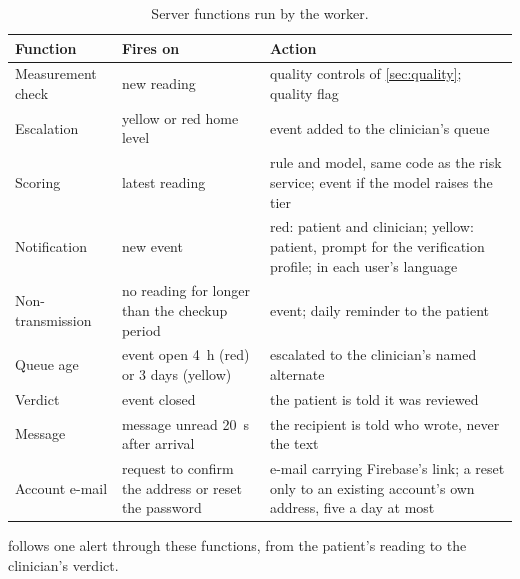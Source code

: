 \begin{table}[htbp]
\centering\footnotesize
\caption{Server functions run by the worker.}\label{tab:triggers}
\begin{tabularx}{\textwidth}{@{}>{\raggedright\arraybackslash}p{3.0cm} >{\raggedright\arraybackslash}p{3.2cm} X@{}}
\toprule
\textbf{Function} & \textbf{Fires on} & \textbf{Action} \\
\midrule
Measurement check & new reading & quality controls of \cref{sec:quality}; quality flag \\
Escalation & yellow or red home level & event added to the clinician's queue \\
Scoring & latest reading & rule and model, same code as the risk service; event if the model raises the tier \\
Notification & new event & red: patient and clinician; yellow: patient, prompt for the verification profile; in each user's language \\
Non-transmission & no reading for longer than the checkup period & event; daily reminder to the patient \\
Queue age & event open 4~h (red) or 3 days (yellow) & escalated to the clinician's named alternate \\
Verdict & event closed & the patient is told it was reviewed \\
Message & message unread 20~s after arrival & the recipient is told who wrote, never the text \\
Account e-mail & request to confirm the address or reset the password & e-mail carrying Firebase's link; a reset only to an existing account's own address, five a day at most \\
\bottomrule
\end{tabularx}
\end{table}

 follows one alert through these functions, from the patient's reading to the clinician's verdict.

